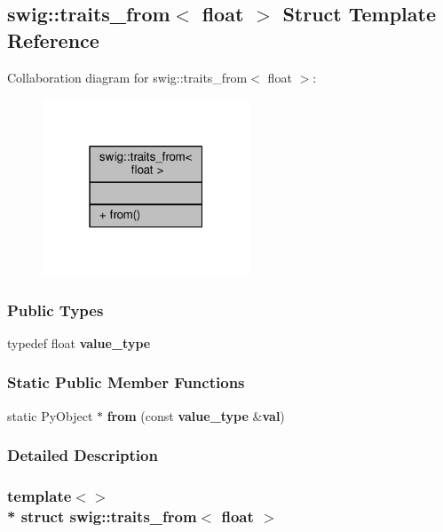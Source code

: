 \subsection{swig\+:\+:traits\+\_\+from$<$ float $>$ Struct Template Reference}
\label{structswig_1_1traits__from_3_01float_01_4}


Collaboration diagram for swig\+:\+:traits\+\_\+from$<$ float $>$\+:
\nopagebreak
\begin{figure}[H]
\begin{center}
\leavevmode
\includegraphics[width=175pt]{d3/d0a/structswig_1_1traits__from_3_01float_01_4__coll__graph}
\end{center}
\end{figure}
\subsubsection*{Public Types}
\begin{DoxyCompactItemize}
\item 
typedef float {\bf value\+\_\+type}
\end{DoxyCompactItemize}
\subsubsection*{Static Public Member Functions}
\begin{DoxyCompactItemize}
\item 
static Py\+Object $\ast$ {\bf from} (const {\bf value\+\_\+type} \&{\bf val})
\end{DoxyCompactItemize}


\subsubsection{Detailed Description}
\subsubsection*{template$<$$>$\\*
struct swig\+::traits\+\_\+from$<$ float $>$}



